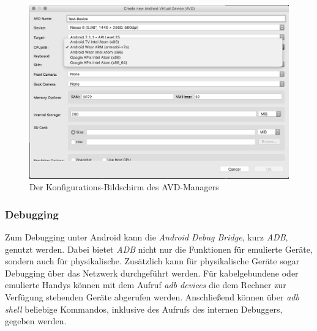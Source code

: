 			\begin{figure}[htbp]
				\centering
				\includegraphics[width=\textwidth]{bilder/pentest_mobile_anwendungen/vergleich_aktuelle_situation/20170215_AVD-Config-Screen.png}
				\caption{Der Konfigurations-Bildschirm des AVD-Managers}
				\label{fig:VergleichAVDConfig}
			\end{figure}
			
			\subsubsection{Debugging}	
			Zum Debugging unter Android kann die \textit{Android Debug Bridge}, kurz \textit{ADB}, genutzt werden. Dabei bietet \textit{ADB} nicht nur die Funktionen für emulierte Geräte, sondern auch für physikalische. Zusätzlich kann für physikalische Geräte sogar Debugging über das Netzwerk durchgeführt werden. Für kabelgebundene oder emulierte Handys können mit dem Aufruf \textit{adb devices} die dem Rechner zur Verfügung stehenden Geräte abgerufen werden. Anschließend können über \textit{adb shell} beliebige Kommandos, inklusive des Aufrufs des internen Debuggers, gegeben werden.\cite{androidDebugBridge}\\
			
